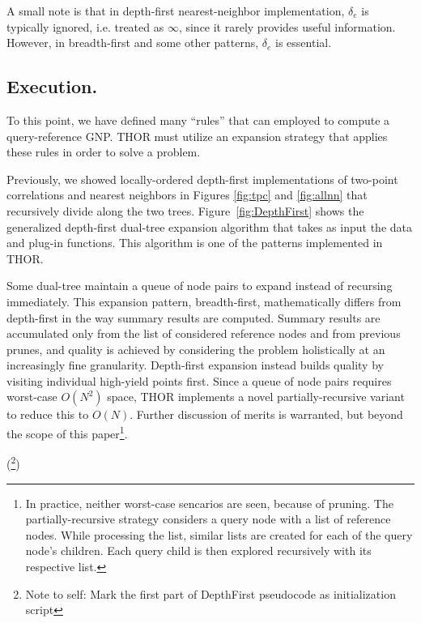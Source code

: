 \documentclass[twoside,leqno,twocolumn]{article}
\newcommand{\authornote}[1]{(\footnote{Note to self: #1})}
\newcommand{\authorsnote}[1]{\authornote{#1}}
\newcommand{\summary}{\delta}
\newcommand{\fig}[1]{Figure~\ref{fig:#1}}
\newcommand{\mysub}[1]{\subsection{#1.}}
\newcommand{\lettermu}{e}
\newcommand{\deltamu}{\summary_{\lettermu}}
\begin{document}
\noindent A small note is that in depth-first nearest-neighbor implementation, $\deltamu$ is typically ignored, i.e. treated as $\infty$, since it rarely provides useful information.
However, in breadth-first and some other patterns, $\deltamu$ is essential.

\mysub{Execution}

To this point, we have defined many ``rules'' that can employed to compute a query-reference GNP.
THOR must utilize an expansion strategy that applies these rules in order to solve a problem.

Previously, we showed locally-ordered depth-first implementations of two-point correlations and nearest neighbors in Figures \ref{fig:tpc} and \ref{fig:allnn} that recursively divide along the two trees.
\fig{DepthFirst} shows the generalized depth-first dual-tree expansion algorithm that takes as input the data and plug-in functions.
This algorithm is one of the patterns implemented in THOR.

Some dual-tree maintain a queue of node pairs to expand instead of recursing immediately.
This expansion pattern, breadth-first, mathematically differs from depth-first in the way summary results are computed.
Summary results are accumulated only from the list of considered reference nodes and from previous prunes, and quality is achieved by considering the problem holistically at an increasingly fine granularity.
Depth-first expansion instead builds quality by visiting individual high-yield points first.
Since a queue of node pairs requires worst-case $O(N^2)$ space, THOR implements a novel partially-recursive variant to reduce this to $O(N)$.
Further discussion of merits is warranted, but beyond the scope of this paper\footnote{
  In practice, neither worst-case sencarios are seen, because of pruning.
  The partially-recursive strategy considers a query node with a list of reference nodes.
  While processing the list, similar lists are created for each of the query node's children.
  Each query child is then explored recursively with its respective list.}.

\authorsnote{Mark the first part of DepthFirst pseudocode as initialization script}
\end{document}
